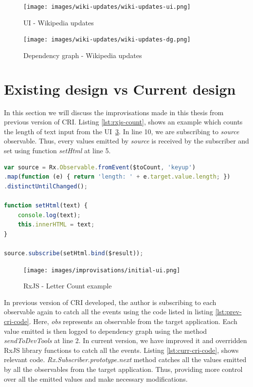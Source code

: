 \begin{figure}[!h]
	\centering
	\texttt{[image: images/wiki-updates/wiki-updates-ui.png]}
	\caption{UI - Wikipedia updates}
	\label{fig:rxjs-wiki-updates-ui}
\end{figure}
\begin{figure}[!h]
	\centering
	\texttt{[image: images/wiki-updates/wiki-updates-dg.png]}
	\caption{Dependency graph - Wikipedia updates}
	\label{fig:rxjs-wiki-updates-dg}
\end{figure}

\section{Existing design vs Current design}
In this section we will discuss the improvisations made in this thesis from previous version of CRI. Listing \ref{lst:rxjs-count}, shows an example which counts the length of text input from the UI~\ref{fig:rxjs-count-ui}. In line 10, we are subscribing to \textit{source} observable. Thus, every values emitted by \textit{source} is received by the subscriber and set using function \textit{setHtml} at line 5. 


\begin{lstlisting}[language=JavaScript, caption=RxJS - Letter Count, label={lst:rxjs-count}]
var source = Rx.Observable.fromEvent($toCount, 'keyup')
.map(function (e) { return 'length: ' + e.target.value.length; })
.distinctUntilChanged();

function setHtml(text) {
	console.log(text);
	this.innerHTML = text;
}

source.subscribe(setHtml.bind($result));
\end{lstlisting}

\begin{figure}[!h]
	\centering
	\texttt{[image: images/improvisations/initial-ui.png]}
	\caption{RxJS - Letter Count example}
	\label{fig:rxjs-count-ui}
\end{figure}


In previous version of CRI developed, the author is subscribing to each observable again to catch all the events using the code listed in listing \ref{lst:prev-cri-code}. Here, \textit{obs} represents an observable from the target application. Each value emitted is then logged to dependency graph using the method \textit{sendToDevTools} at line 2. In current version, we have improved it and overridden RxJS library functions to catch all the events. Listing \ref{lst:curr-cri-code}, shows relevant code. \textit{Rx.Subscriber.prototype.next} method catches all the values emitted by all the observables from the target application. Thus, providing more control over all the emitted values and make necessary modifications. 

